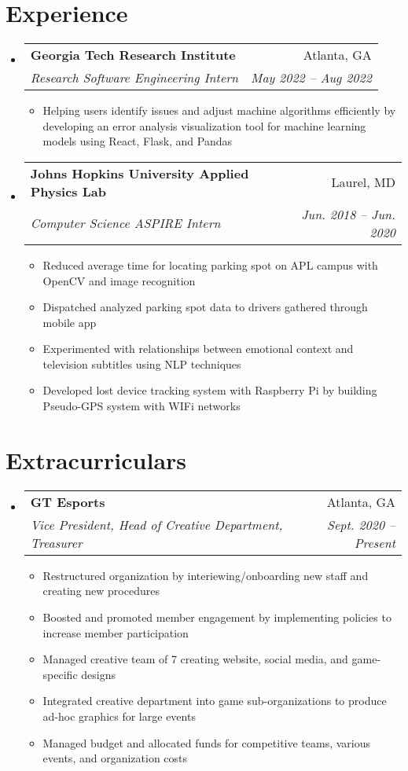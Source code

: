 \documentclass[a4paper,11pt]{extarticle}
\makeatletter
\newcommand{\resumeItem}[1]{
	\item\small{
		#1 \vspace{-1pt}
	}
}
\newcommand{\resumeSubheading}[4]{
	\vspace{-1pt}\item
		\begin{tabular*}{1\linewidth}{l@{\extracolsep{\fill}}r}
			\textbf{#1} & #2 \\
			\textit{#3} & \textit{#4} \\
		\end{tabular*}\vspace{-3pt}
}
\newcommand{\resumeSubHeadingListStart}{\begin{itemize}[leftmargin=0.15in,label={}]}
\newcommand{\resumeSubHeadingListEnd}{\end{itemize}}
\newcommand{\resumeItemListStart}{\begin{itemize}\vspace{-3pt}}
\newcommand{\resumeItemListEnd}{\end{itemize}\vspace{-3pt}}
\makeatother
\begin{document}
\section{Experience}
	\resumeSubHeadingListStart
        \resumeSubheading
            {Georgia Tech Research Institute}
            {Atlanta, GA}
            {Research Software Engineering Intern}
            {May 2022 -- Aug 2022}
        \resumeItemListStart
            \resumeItem{Helping users identify issues and adjust machine algorithms
                efficiently by developing an error analysis visualization tool for
                machine learning models using React, Flask, and Pandas}
        \resumeItemListEnd
        \resumeSubheading
            {Johns Hopkins University Applied Physics Lab}
            {Laurel, MD}
            {Computer Science ASPIRE Intern}
            {Jun. 2018 -- Jun. 2020}
        \resumeItemListStart
            \resumeItem{Reduced average time for locating parking spot on APL
                campus with OpenCV and image recognition}
            \resumeItem{Dispatched analyzed parking spot data to drivers
                gathered through mobile app}
            \resumeItem{Experimented with relationships between emotional
                context and television subtitles using NLP techniques}
            \resumeItem{Developed lost device tracking system with Raspberry
                Pi by building Pseudo-GPS system with WIFi networks}
        \resumeItemListEnd
	\resumeSubHeadingListEnd

\section{Extracurriculars}
	\resumeSubHeadingListStart
        \resumeSubheading
            {GT Esports}
            {Atlanta, GA}
            {Vice President, Head of Creative Department, Treasurer}
            {Sept. 2020 -- Present}
        \resumeItemListStart
            \resumeItem{Restructured organization by interiewing/onboarding new
                staff and creating new procedures}
            \resumeItem{Boosted and promoted member engagement by implementing
                policies to increase member participation}
            \resumeItem{Managed creative team of 7 creating website, social
                media, and game-specific designs}
            \resumeItem{Integrated creative department into game sub-organizations
                to produce ad-hoc graphics for large events}
             \resumeItem{Managed budget and allocated funds for competitive teams, various events, and organization costs}
        \resumeItemListEnd
	\resumeSubHeadingListEnd
\end{document}
